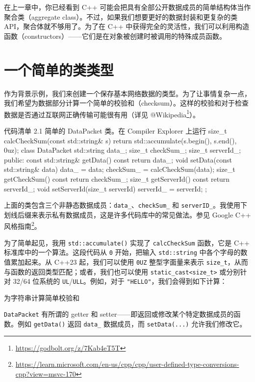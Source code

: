 在上一章中，你已经看到 C++ 可能会把具有全部公开数据成员的简单结构体当作聚合类（aggregate class）。不过，如果我们想要更好的数据封装和更复杂的类 API，聚合体就不够用了。为了在 C++ 中获得完全的灵活性，我们可以利用构造函数（constructors）——它们是在对象被创建时被调用的特殊成员函数。

\section{一个简单的类类型}

作为背景示例，我们来创建一个保存基本网络数据的类型。为了让事情复杂一点，我们希望为数据部分计算一个简单的校验和（checksum）。这样的校验和对于检查数据是否通过互联网正确传输可能很有用（详见 @Wikipedia\footnote{\url{https://godbolt.org/z/7Kab4eT5T}}）。

\begin{codeboxt}[cpp]{代码清单 2.1 简单的 DataPacket 类。在 Compiler Explorer 上运行}
size_t calcCheckSum(const std::string& s) {
return std::accumulate(s.begin(), s.end(), 0uz);
}
class DataPacket {
std::string data_;
size_t checkSum_;
size_t serverId_;
public:
const std::string& getData() const { return data_; }
void setData(const std::string& data) {
data_ = data;
checkSum_ = calcCheckSum(data);
}
size_t getCheckSum() const { return checkSum_; }
size_t getServerId() const { return serverId_; }
void setServerId(size_t serverId) { serverId_ = serverId; }
};
\end{codeboxt}


上面的类包含三个非静态数据成员：\texttt{data\_}、\texttt{checkSum\_} 和 \texttt{serverID\_}。我使用下划线后缀来表示私有数据成员，这是许多代码库中的常见做法。参见 Google C++ 风格指南\footnote{\url{https://learn.microsoft.com/en-us/cpp/cpp/user-defined-type-conversions-cpp?view=msvc-170}}。

为了简单起见，我用 \texttt{std::accumulate()} 实现了 \texttt{calcCheckSum} 函数，它是 C++ 标准库中的一个算法。这段代码从 \texttt{0} 开始，把输入 \texttt{std::string} 中各个字母的数值累加起来。从 C++23 起，我们可以使用 \texttt{0UZ} 整型字面量来表示 \texttt{size\_t}，从而与函数的返回类型匹配；或者，我们也可以使用 \texttt{static\_cast<size\_t>} 或分别针对 32/64 位系统的 \texttt{UL}/\texttt{ULL}。例如，对于 \texttt{"HELLO"}，我们会得到如下计算：

为字符串计算简单校验和

\texttt{DataPacket} 有所谓的 getter 和 setter——即返回或修改某个特定数据成员的函数。例如 \texttt{getData()} 返回 \texttt{data\_} 数据成员，而 \texttt{setData(...)} 允许我们修改它。

